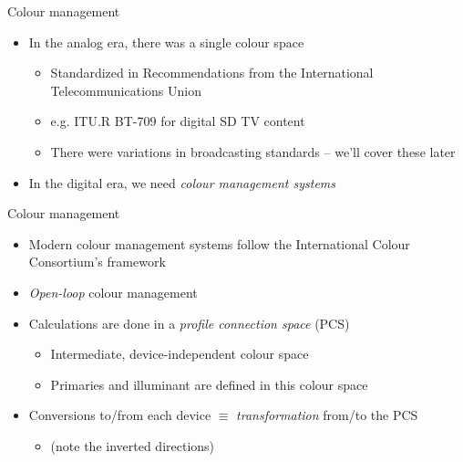 \documentclass[aspectratio=169,handout,usepdftitle=false]{fireshonks}
\begin{document}
\begin{frame}{Colour management}
    \begin{itemize}
        \item In the analog era, there was a single colour space
              \begin{itemize}
                  \item Standardized in Recommendations from the International Telecommunications Union
                  \item e.g. ITU.R BT-709 \parencite*{BT709} for digital SD TV content
                  \item There were variations in broadcasting standards -- we'll cover these later
              \end{itemize}
        \item In the digital era, we need \emph{colour management systems}
    \end{itemize}
\end{frame}
\begin{frame}{Colour management}
    \begin{itemize}
        \item Modern colour management systems follow the International Colour Consortium's framework \autocite{allen}
        \item \emph{Open-loop} colour management
        \item Calculations are done in a \emph{profile connection space} (PCS)
              \begin{itemize}
                  \item Intermediate, device-independent colour space
                  \item Primaries and illuminant are defined in this colour space
              \end{itemize}
        \item Conversions to/from each device $\equiv$ \emph{transformation} from/to the PCS
              \begin{itemize}
                  \item (note the inverted directions)
              \end{itemize}
    \end{itemize}
\end{frame}
\end{document}
